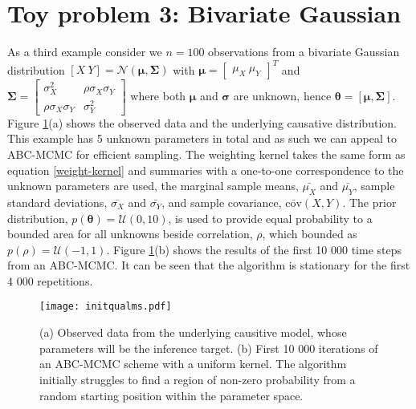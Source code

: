 \section{Toy problem 3: Bivariate Gaussian}
As a third example consider we $n = 100$ observations from a bivariate Gaussian distribution $[X\ Y] = \mathcal{N}(\bm{\mu},\bm{\Sigma})$ with $\bm{\mu} = \begin{bmatrix}
\mu_X\ \mu_Y
\end{bmatrix}^T$ and $\bm{\Sigma} = \begin{bmatrix}
\sigma^2_X & \rho\sigma_X\sigma_Y\\
\rho\sigma_X\sigma_Y & \sigma^2_Y
\end{bmatrix} $ where both $\bm{\mu}$ and $\bm{\sigma}$ are unknown, hence $\bm{\theta} = [\bm{\mu},\bm{\Sigma}]$. Figure \ref{init-qualms}(a) shows the observed data and the underlying causative distribution. This example has 5 unknown parameters in total and as such we can appeal to ABC-MCMC for efficient sampling. The weighting kernel takes the same form as equation \ref{weight-kernel} and summaries with a one-to-one correspondence to the unknown parameters are used, the marginal sample means, $\bar{\mu_X}$ and $\bar{\mu_Y}$, sample standard deviations, $\bar{\sigma_X}$ and $\bar{\sigma_Y}$, and sample covariance, $\bar{\text{cov}}(X,Y)$. The prior distribution, $p(\bm{\theta}) = \mathcal{U}(0,10)$, is used to provide equal probability to a bounded area for all unknowns beside correlation, $\rho$, which bounded as $p(\rho) = \mathcal{U}(-1,1)$. Figure \ref{init-qualms}(b) shows the results of the first 10 000 time steps from an ABC-MCMC. It can be seen that the algorithm is stationary for the first 4 000 repetitions.\\

\begin{figure}[H]
	\centering
	\texttt{[image: initqualms.pdf]}
	\caption{(a) Observed data from the underlying causitive model, whose parameters will be the inference target. (b) First 10 000 iterations of an ABC-MCMC scheme with a uniform kernel. The algorithm initially struggles to find a region of non-zero probability from a random starting position within the parameter space.}
	\label{init-qualms}
\end{figure}


